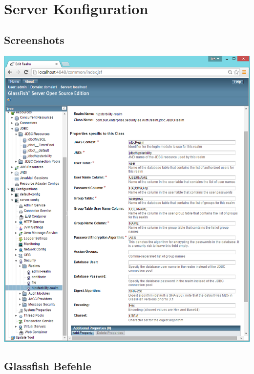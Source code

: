 \section{Server Konfiguration}
\subsection{Screenshots}
\begin{minipage}[t]{\textwidth}
	\includegraphics[width = \linewidth]{img/screenshot_realm.png}
	\label{fig:realm_screenshot}
\end{minipage}

\newpage
\subsection{Glassfish Befehle}




